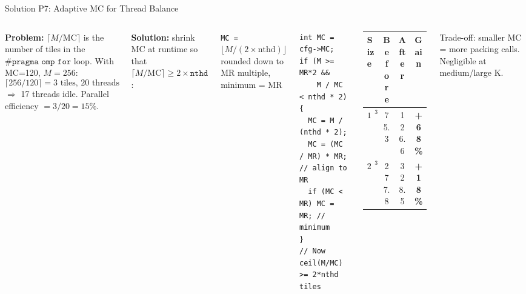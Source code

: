 \documentclass[aspectratio=169]{beamer}
\begin{document}
\begin{frame}[fragile]{Solution P7: Adaptive MC for Thread Balance}
  \begin{columns}
    \textbf{Problem:} $\lceil M/\text{MC} \rceil$ is the number of tiles in the
    $\texttt{\#pragma omp for}$ loop. With MC=120, $M=256$:
    \[ \lceil 256/120 \rceil = 3 \text{ tiles, 20 threads} \]
    $\Rightarrow$ 17 threads idle. Parallel efficiency $= 3/20 = 15\%$.

    \vspace{0.3cm}
    \textbf{Solution:} shrink MC at runtime so that
    $\lceil M/\text{MC} \rceil \geq 2 \times \texttt{nthd}$:

    \vspace{0.2cm}
    \hspace{0.5cm}\texttt{MC = $\lfloor M / (2 \times \text{nthd}) \rfloor$}\\
    \hspace{0.5cm}rounded down to MR multiple, minimum = MR

    \begin{lstlisting}[caption={Adaptive MC in sgemm\_task1}]
int MC = cfg->MC;
if (M >= MR*2 &&
    M / MC < nthd * 2) {
  MC = M / (nthd * 2);
  MC = (MC / MR) * MR;  // align to MR
  if (MC < MR) MC = MR; // minimum
}
// Now ceil(M/MC) >= 2*nthd tiles
    \end{lstlisting}
    \vspace{0.3cm}
    \begin{center}
    \footnotesize
    \begin{tabular}{lccc}
      \toprule
      Size & Before & After & Gain \\
      \midrule
      $128^3$ & 75.3 & 126.6 & \textcolor{good}{\textbf{+68\%}} \\
      $256^3$ & 277.8 & 328.5 & \textcolor{good}{\textbf{+18\%}} \\
      \bottomrule
    \end{tabular}
    \end{center}
    Trade-off: smaller MC = more packing calls. Negligible at medium/large K.
  \end{columns}
\end{frame}
\end{document}
